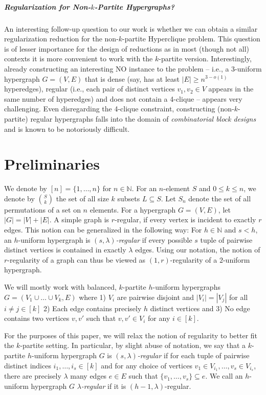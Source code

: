 \documentclass[a4paper,UKenglish,cleveref, autoref, thm-restate,numberwithinsect]{lipics-v2021}
\newcommand{\reg}{\lambda}
\begin{document}
\subparagraph*{Regularization for Non-\boldmath$k$-Partite Hypergraphs?}
An interesting follow-up question to our work is whether we can obtain a similar regularization reduction for the non-$k$-partite Hyperclique problem. This question is of lesser importance for the design of reductions as in most (though not all) contexts it is more convenient to work with the $k$-partite version. Interestingly, already constructing an interesting NO instance to the problem -- i.e., a 3-uniform hypergraph $G = (V, E)$ that is dense (say, has at least $|E| \geq n^{3-o(1)}$ hyperedges), regular (i.e., each pair of distinct vertices $v_1, v_2 \in V$ appears in the same number of hyperedges) and does not contain a 4-clique -- appears very challenging. Even disregarding the 4-clique constraint, constructing (non-$k$-partite) regular hypergraphs falls into the domain of \emph{combinatorial block designs} and is known to be notoriously difficult.

\section{Preliminaries}\label{sec:preliminaries}
We denote by $[n] = \{1,\dots,n\}$ for $n \in \mathbb N$.
For an $n$-element $S$ and $0 \leq k \leq n$, we denote by $\binom{S}{k}$ the set of all size $k$ subsets $L \subseteq S$.
Let $S_n$ denote the set of all permutations of a set on $n$ elements.
For a hypergraph $G = (V,E)$, let $|G| = |V|+|E|$. 
A simple graph is $r$-regular, if every vertex is incident to exactly $r$ edges.
This notion can be generalized in the following way:
For $h \in \mathbb N$ and $s < h$, an $h$-uniform hypergraph is \emph{$(s, \reg)$-regular} if every possible $s$ tuple of pairwise distinct vertices is contained in exactly $\reg$ edges. 
Using our notation, the notion of $r$-regularity of a graph can thus be viewed as $(1,r)$-regularity of a $2$-uniform hypergraph.

We will mostly work with balanced, $k$-partite $h$-uniform hypergraphs $G = (V_1\cup\dots \cup V_k, E)$ where
1) $V_i$ are pairwise disjoint and $|V_i| = |V_j|$ for all $i \neq j \in [k]$
2) Each edge contains precisely $h$ distinct vertices and
3) No edge contains two vertices $v,v'$ such that $v,v'\in V_i$ for any $i\in [k]$.

For the purposes of this paper, we will relax the notion of regularity to better fit the $k$-partite setting. 
In particular, by slight abuse of notation, we say that a $k$-partite $h$-uniform hypergraph $G$ is \emph{$(s, \reg)$-regular} if for each tuple of pairwise distinct indices $i_1,\dots, i_s\in [k]$ and for any choice of vertices $v_1\in V_{i_1},\dots, v_s\in V_{i_s}$, there are precisely $\reg$ many edges $e\in E$ such that $\{v_1,\dots, v_s\} \subseteq e$.
We call an $h$-uniform hypergraph $G$ \emph{$\reg$-regular} if it is $(h-1,\reg)$-regular.
\end{document}
